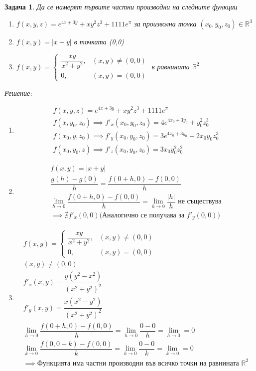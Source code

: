 \documentclass[a4paper,fleqn,12pt]{article}
\newtheorem{task}{Задача}[section]
\begin{document}
\begin{task}
Да се намерят първите частни производни на следните функции
\begin{enumerate}

\item $f(x,y,z) = e^{4x+3y} + xy^2z^3 + 1111e^\pi$ за произволна точка $(x_0, y_0, z_0) \in \mathbb{R}^3$
\item $f(x,y) = \vert x + y \vert$ в точката (0,0)
\item $
f(x,y) = 
\begin{cases}
\dfrac{xy}{x^2 + y^2}, & (x,y) \neq (0,0)  \\
0, & (x,y) = (0,0) 
\end{cases}$ в равнината $\mathbb{R}^2$ 
\end{enumerate}
Решение: \\

\begin{enumerate}
\item 
\begin{gather*}
f(x,y,z) = e^{4x+3y} + xy^2z^3 + 1111e^\pi \\
f(x,y_0,z_0) \implies f'_x (x_0,y_0,z_0) = 4e^{4x_0+3y_0} + y_0 ^2 z_0 ^3 \\
f(x_0,y,z_0) \implies f'_y (x_0,y_0,z_0) = 3e^{4x_0+3y_0} + 2x_0 y_0 z_0 ^3 \\
f(x_0,y_0,z) \implies f'_z (x_0,y_0,z_0) = 3x_0 y_0 ^2 z_0 ^2
\end{gather*}

\item 
\begin{gather*}
f(x,y) = \vert x + y \vert \\
\dfrac{g(h) - g(0)}{h} = \dfrac{f(0+h,0) - f(0,0)}{h} \\
\lim\limits_{h \to 0} \dfrac{f(0+h,0) - f(0,0)}{h} = \lim\limits_{h \to 0} \dfrac{\vert h \vert}{h} \text{ не съществува} \\
\implies \nexists f'_x (0,0) \text{(Аналогично се получава за $f'_y(0,0)$)} 
\end{gather*}

\item 
\begin{gather*}
f(x,y) = 
\begin{cases}
\dfrac{xy}{x^2 + y^2}, & (x,y) \neq (0,0)  \\
0, & (x,y) = (0,0) 
\end{cases}\\
(x,y) \neq (0,0)\\
f'_x (x,y) = \dfrac{y(y^2 - x^2)}{(x^2 + y^2)^2}\\
f'_y (x,y) = \dfrac{x(x^2 - y^2)}{(x^2 + y^2)^2}\\
\lim\limits_{h \to 0} \dfrac{f(0+h,0) - f(0,0)}{h} = \lim\limits_{h \to 0} \dfrac{0-0}{h} = \lim\limits_{h \to 0} = 0 \\
\lim\limits_{k \to 0} \dfrac{f(0,0+k) - f(0,0)}{k} =  \lim\limits_{k \to 0} \dfrac{0-0}{k} = \lim\limits_{k \to 0} = 0 \\
\implies  \text{Функцията има частни производни във всичко точки на равнината $\mathbb{R}^2$}
\end{gather*}


\end{enumerate}
\end{task}
\end{document}
